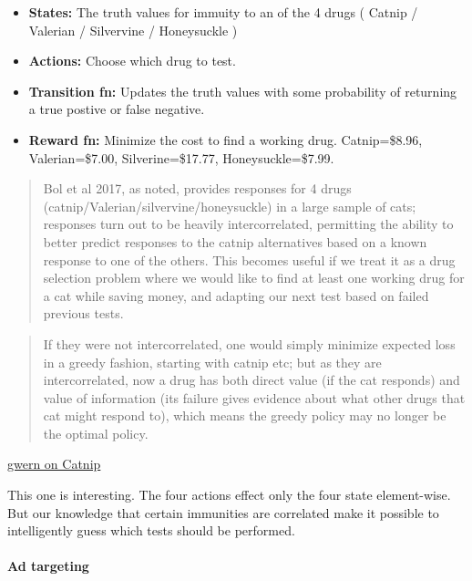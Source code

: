 \begin{itemize}
\tightlist
\item
  \textbf{States:} The truth values for immuity to an of the 4 drugs (
  Catnip / Valerian / Silvervine / Honeysuckle )
\item
  \textbf{Actions:} Choose which drug to test.
\item
  \textbf{Transition fn:} Updates the truth values with some probability
  of returning a true postive or false negative.
\item
  \textbf{Reward fn:} Minimize the cost to find a working drug.
  Catnip=\$8.96, Valerian=\$7.00, Silverine=\$17.77, Honeysuckle=\$7.99.
\end{itemize}

\begin{quote}
Bol et al 2017, as noted, provides responses for 4 drugs
(catnip/Valerian/silvervine/honeysuckle) in a large sample of cats;
responses turn out to be heavily intercorrelated, permitting the ability
to better predict responses to the catnip alternatives based on a known
response to one of the others. This becomes useful if we treat it as a
drug selection problem where we would like to find at least one working
drug for a cat while saving money, and adapting our next test based on
failed previous tests.
\end{quote}

\begin{quote}
If they were not intercorrelated, one would simply minimize expected
loss in a greedy fashion, starting with catnip etc; but as they are
intercorrelated, now a drug has both direct value (if the cat responds)
and value of information (its failure gives evidence about what other
drugs that cat might respond to), which means the greedy policy may no
longer be the optimal policy.
\end{quote}

\href{https://www.gwern.net/Catnip\#optimal-catnip-alternative-selection-solving-the-mdp}{gwern
on Catnip}

This one is interesting. The four actions effect only the four state
element-wise. But our knowledge that certain immunities are correlated
make it possible to intelligently guess which tests should be performed.

\hypertarget{ad-targeting}{%
\paragraph{Ad targeting}\label{ad-targeting}}

